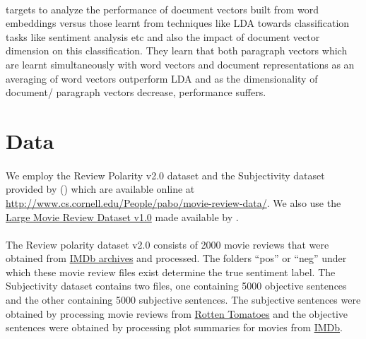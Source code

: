 \documentclass[a4paper,26pt]{article}
\begin{document}
\paragraph{}
\cite{dai2015document} targets to analyze the performance of document vectors built from word embeddings versus those learnt from techniques like LDA towards classification tasks like sentiment analysis etc and also the impact of document vector dimension on this classification. They learn that both paragraph vectors which are learnt simultaneously with word vectors and document representations as an averaging of word vectors outperform LDA and as the dimensionality of document/ paragraph vectors decrease, performance suffers.

\section{Data}

\paragraph{}

We employ the Review Polarity v2.0 dataset and the Subjectivity dataset provided by (\cite{pang2004sentimental}) which are available online at \url{http://www.cs.cornell.edu/People/pabo/movie-review-data/}. We also use the \href{http://ai.stanford.edu/~amaas/data/sentiment/}{Large Movie Review Dataset v1.0} made available by \cite{maas2011learning}. 

\paragraph{}

The Review polarity dataset v2.0 consists of 2000 movie reviews that were obtained from \href{http://reviews.imdb.com/Reviews}{IMDb archives} and processed. The folders ``pos'' or ``neg'' under which these movie review files exist determine the true sentiment label. The Subjectivity dataset contains two files, one containing 5000 objective sentences and the other containing 5000 subjective sentences. The subjective sentences were obtained by processing movie reviews from \href{http://www.rottentomatoes.com/}{Rotten Tomatoes} and the objective sentences were obtained by processing plot summaries for movies from \href{http://www.imdb.com}{IMDb}.

\paragraph{} 
\end{document}
